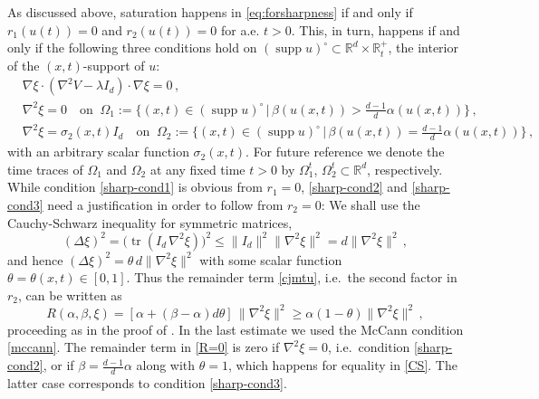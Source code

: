 \documentclass[reqno]{amsart}
\newcommand{\tr}{\operatorname{tr}}
\newcommand{\R}{\mathbb{R}}
\DeclareMathOperator{\supp}{supp}
\begin{document}
As discussed above, saturation happens in \eqref{eq:forsharpness} if and only if $r_1(u(t))=0$ and $r_2(u(t))=0$ for a.e. $t>0$. This, in turn, happens if and only if the following three conditions hold on $(\supp u)^\circ\subset \R^d\times\R^+_t$, the interior of the $(x,t)$-support of $u$:
\begin{align}
    &\nabla\xi\cdot(\nabla^2 V-\lambda I_d) \cdot \nabla\xi=0\,, \label{sharp-cond1}\\
    & \nabla^2\xi = 0 \quad \mbox{on }\: \Omega_1:=\big\{(x,t)\in(\supp u)^\circ\,\big|\, \beta(u(x,t)) > \frac{d-1}{d} \alpha(u(x,t))\big\}\,,\label{sharp-cond2}\\
    & \nabla^2\xi = \sigma_2(x,t)I_d \quad \mbox{on }\: \Omega_2:=\big\{(x,t)\in(\supp u)^\circ\,\big|\, \beta(u(x,t)) =\frac{d-1}{d}  \alpha(u(x,t))\big\}\,,\label{sharp-cond3}
\end{align}
with an arbitrary scalar function $\sigma_2(x,t)$. For future reference we denote the time traces of $\Omega_1$ and $\Omega_2$ at any fixed time $t>0$ by $\Omega_1^t$, $\Omega_2^t\subset \R^d$, respectively.
While condition \eqref{sharp-cond1} is obvious from $r_1=0$, \eqref{sharp-cond2} and \eqref{sharp-cond3} need a justification in order to follow from $r_2=0$: We shall use the Cauchy-Schwarz inequality for symmetric matrices, 
\begin{equation}\label{CS}
  (\Delta \xi)^2=\big(\tr(I_d\,\nabla^2\xi)\big)^2 
  \le \|I_d\|^2 \|\nabla^2\xi\|^2 = d\|\nabla^2\xi\|^2\,,
\end{equation}
and hence $(\Delta \xi)^2=\theta\,d\|\nabla^2\xi\|^2$ with some scalar function $\theta=\theta(x,t)\in [0,1]$. Thus the remainder term \eqref{cjmtu}, i.e.\ the second factor in $r_2$, can be written as
\begin{equation}\label{R=0}
  R(\alpha,\beta,\xi) = [\alpha+(\beta-\alpha) d\theta] \,\|\nabla^2\xi\|^2 \ge\alpha(1-\theta) \|\nabla^2\xi\|^2\,,
\end{equation}
proceeding as in the proof of \cite[Theorem 11]{CJMTU}. In the last estimate we used the McCann condition \eqref{mccann}.
The remainder term in \eqref{R=0} is zero if $\nabla^2\xi=0$, i.e.\ condition \eqref{sharp-cond2}, or if $\beta =\frac{d-1}{d} \alpha$ along with $\theta=1$, which happens for equality in \eqref{CS}. The latter case corresponds to condition \eqref{sharp-cond3}.
\end{document}
